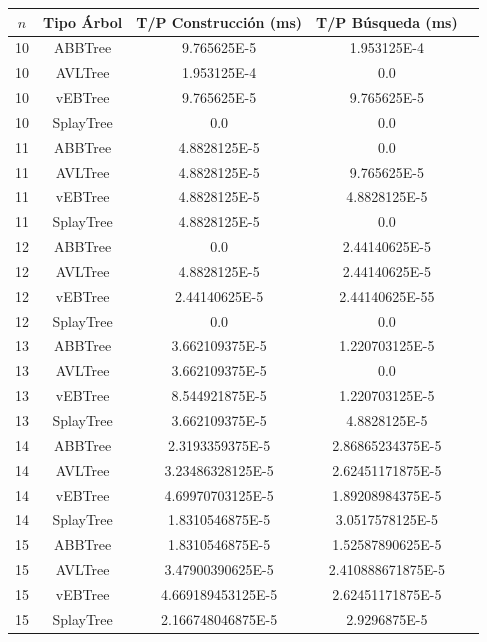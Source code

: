 \documentclass[letterpaper,12pt]{article}
\begin{document}
\begin{tabular}{|c|c|c|c|c|}
\hline
\textbf{$n$} & \textbf{Tipo Árbol} & \textbf{T/P Construcción (ms)} & \textbf{T/P Búsqueda (ms)} \\
\hline
10 & ABBTree & 9.765625E-5 & 1.953125E-4 \\
\hline
10 & AVLTree & 1.953125E-4 & 0.0 \\
\hline
10 & vEBTree & 9.765625E-5 & 9.765625E-5\\
\hline
10 & SplayTree & 0.0  & 0.0 \\
\hline
\hline
11 & ABBTree & 4.8828125E-5 & 0.0 \\
\hline
11 & AVLTree & 4.8828125E-5 & 9.765625E-5 \\
\hline
11 & vEBTree &  4.8828125E-5 & 4.8828125E-5\\
\hline
11 & SplayTree & 4.8828125E-5 & 0.0 \\
\hline
\hline
12 & ABBTree & 0.0 & 2.44140625E-5  \\
\hline
12 & AVLTree & 4.8828125E-5 & 2.44140625E-5 \\
\hline
12 & vEBTree & 2.44140625E-5 & 2.44140625E-55\\
\hline
12 & SplayTree & 0.0 & 0.0 \\
\hline
\hline
13 & ABBTree & 3.662109375E-5 & 1.220703125E-5   \\
\hline
13 & AVLTree & 3.662109375E-5 & 0.0 \\
\hline
13 & vEBTree & 8.544921875E-5 & 1.220703125E-5\\
\hline
13 & SplayTree & 3.662109375E-5 & 4.8828125E-5 \\
\hline
\hline
14 & ABBTree & 2.3193359375E-5 & 2.86865234375E-5 \\
\hline
14 & AVLTree & 3.23486328125E-5 & 2.62451171875E-5 \\
\hline
14 & vEBTree & 4.69970703125E-5 & 1.89208984375E-5\\
\hline
14 & SplayTree & 1.8310546875E-5 & 3.0517578125E-5 \\
\hline
\hline
15 & ABBTree & 1.8310546875E-5 & 1.52587890625E-5 \\
\hline
15 & AVLTree & 3.47900390625E-5 & 2.410888671875E-5 \\
\hline
15 & vEBTree & 4.669189453125E-5  & 2.62451171875E-5\\
\hline
15 & SplayTree & 2.166748046875E-5 & 2.9296875E-5 \\
\hline
\end{tabular}
\end{document}
